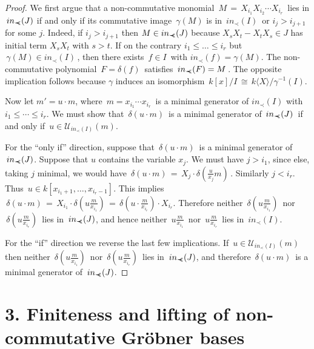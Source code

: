 \documentclass{proc-l}
\theoremstyle{plain}
\theoremstyle{definition}
\newcommand{\precc}{{\prec \kern -5pt\prec }}
\begin{document}
\begin{proof} 
We first argue that a non-commutative monomial 
$\,M \,= \, X_{i_{1}}  X_{i_{2}} \cdots X_{i_{r}} \, $
lies  in $\, in_{\precc }(J)$ if and only if
its commutative image
$\, \gamma (M) $ is in $\, in_{\prec }(I) \,$ or $i_{j}>i_{j+1}$ for some $j$.
Indeed, if $i_{j}>i_{j+1}$ then
$ M \in in_{\precc }(J)$ because
$X_{s}X_{t}-X_{t}X_{s}\in J$ has initial term $X_{s}X_{t}$ with $s>t$.
If on the contrary $i_{1}\leq \dots \leq i_{r}$ but 
$\,\gamma (M) \in in_{\prec } (I) \,$, then there exists
$\,f \in I \,$ with $in_{\prec }(f) = \gamma (M)$.
The non-commutative polynomial $\,F = \delta (f)\,$
satisfies $\,in_{\precc }(F) = M \,$.
The opposite implication follows because $\gamma $ induces an isomorphism
$\,k[x]/I \,\cong \, k \langle X \rangle / \gamma ^{-1}(I)$.

Now let
$m' = u \cdot m$, where $\,m = x_{i_{1}} \cdots x_{i_{r}}\,$
is a minimal generator of $in_{\prec }(I)$ with
$i_{1} \leq \cdots \leq i_{r} $.
We must show that $\, \delta (u \cdot m)\,$ is a minimal generator 
of $\,in_{\precc }(J) \,$ if and only if $\, u \in {\mathcal{U}}_{in_{\prec }(I)}(m) $.

For the ``only if'' direction, suppose that $\,\delta (u \cdot m)\,$ 
is a minimal 
generator of $\,in_{\precc }(J) $. 
Suppose that $u$ contains the variable $x_{j}$.  We must have 
$j>i_{1}$, since else, taking $j$ minimal, we would have
$\,\delta (u \cdot m)\,=\, X_{j} \cdot \delta (\frac{u}{x_{j}}m) \,$. 
Similarly $j<i_{r}$.
Thus $ \, u \in k[x_{i_{1}+1},\ldots , x_{i_{r}-1}]$.
This implies $\,\delta (u \cdot m)\,=\,  
X_{i_{1}} \cdot \delta ( u \frac{ m}{x_{i_{1}}} ) \,= \,
\delta ( u\cdot \frac{ m}{x_{i_{r}}} )  \cdot X_{i_{r}} $.
Therefore neither
$\,\delta ( u\frac{m}{x_{i_{1}}} ) \,$ nor
$\,\delta ( u\frac{m}{x_{i_{r}}} ) \,$ 
lies in $\,in_{\precc }(J)$, and hence neither
$\, u\frac{m}{x_{i_{1}}}\,$ nor
$\,u\frac{m}{x_{i_{r}}} \,$ lies in $\, in_{\prec }(I)$.

For the ``if'' direction we reverse the last few implications.
If $\, u \in {\mathcal{U}}_{in_{\prec }(I)} (m) \,$ then neither
$\,\delta ( u \frac{ m}{x_{i_{1}}} ) \,$ nor
$\,\delta ( u \frac{ m}{x_{i_{r}}} ) \,$ 
lies in $\,in_{\precc }(J)$, and therefore
 $\,\delta (u \cdot m)\,$ is a minimal generator of $\,in_{\precc }(J)$.
\end{proof}


\section*{3. Finiteness and lifting of non-commutative Gr\"{o}bner bases}
\end{document}
